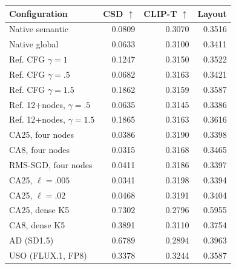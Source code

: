\begin{tabular}{lrrr}
\toprule
Configuration & CSD $\uparrow$ & CLIP-T $\uparrow$ & Layout \\
\midrule
Native semantic & 0.0809 & 0.3070 & 0.3516 \\
Native global & 0.0633 & 0.3100 & 0.3411 \\
Ref. CFG $\gamma=1$ & 0.1247 & 0.3150 & 0.3522 \\
Ref. CFG $\gamma=.5$ & 0.0682 & 0.3163 & 0.3421 \\
Ref. CFG $\gamma=1.5$ & 0.1862 & 0.3159 & 0.3587 \\
Ref. 12+nodes, $\gamma=.5$ & 0.0635 & 0.3145 & 0.3386 \\
Ref. 12+nodes, $\gamma=1.5$ & 0.1865 & 0.3163 & 0.3616 \\
CA25, four nodes & 0.0386 & 0.3190 & 0.3398 \\
CA8, four nodes & 0.0315 & 0.3168 & 0.3465 \\
RMS-SGD, four nodes & 0.0411 & 0.3186 & 0.3397 \\
CA25, $\ell=.005$ & 0.0341 & 0.3198 & 0.3394 \\
CA25, $\ell=.02$ & 0.0468 & 0.3191 & 0.3404 \\
CA25, dense K5 & 0.7302 & 0.2796 & 0.5955 \\
CA8, dense K5 & 0.3891 & 0.3110 & 0.3754 \\
AD (SD1.5) & 0.6789 & 0.2894 & 0.3963 \\
USO (FLUX.1, FP8) & 0.3378 & 0.3244 & 0.3587 \\
\bottomrule
\end{tabular}
